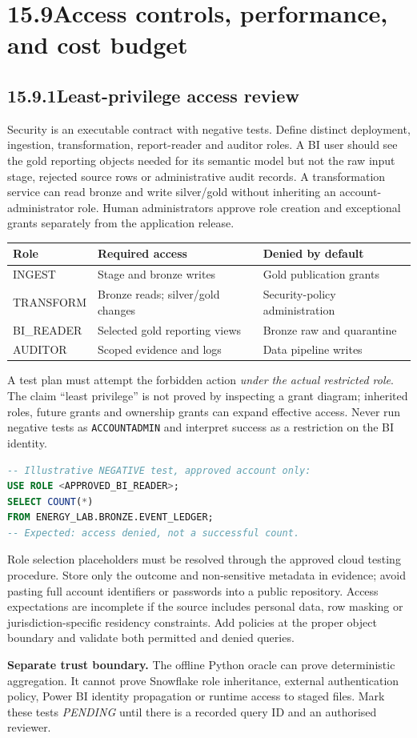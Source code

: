 \documentclass[11pt,twoside]{article}
\newcommand{\topic}[2]{\subsection*{#1\quad #2}}
\begin{document}
\section*{15.9\quad Access controls, performance, and cost budget}
\topic{15.9.1}{Least-privilege access review}
Security is an executable contract with negative tests. Define distinct deployment, ingestion, transformation, report-reader and auditor roles. A BI user should see the gold reporting objects needed for its semantic model but not the raw input stage, rejected source rows or administrative audit records. A transformation service can read bronze and write silver/gold without inheriting an account-administrator role. Human administrators approve role creation and exceptional grants separately from the application release.
\begin{center}\small\begin{tabularx}{\linewidth}{@{}p{27mm}X X@{}}\toprule
Role & Required access & Denied by default\\\midrule
INGEST & Stage and bronze writes & Gold publication grants\\
TRANSFORM & Bronze reads; silver/gold changes & Security-policy administration\\
BI\_READER & Selected gold reporting views & Bronze raw and quarantine\\
AUDITOR & Scoped evidence and logs & Data pipeline writes\\\bottomrule\end{tabularx}\end{center}
A test plan must attempt the forbidden action \emph{under the actual restricted role}. The claim ``least privilege'' is not proved by inspecting a grant diagram; inherited roles, future grants and ownership grants can expand effective access. Never run negative tests as \texttt{ACCOUNTADMIN} and interpret success as a restriction on the BI identity.
\begin{lstlisting}[language=SQL]
-- Illustrative NEGATIVE test, approved account only:
USE ROLE <APPROVED_BI_READER>;
SELECT COUNT(*)
FROM ENERGY_LAB.BRONZE.EVENT_LEDGER;
-- Expected: access denied, not a successful count.
\end{lstlisting}
Role selection placeholders must be resolved through the approved cloud testing procedure. Store only the outcome and non-sensitive metadata in evidence; avoid pasting full account identifiers or passwords into a public repository. Access expectations are incomplete if the source includes personal data, row masking or jurisdiction-specific residency constraints. Add policies at the proper object boundary and validate both permitted and denied queries.
\begin{insight}\textbf{Separate trust boundary.} The offline Python oracle can prove deterministic aggregation. It cannot prove Snowflake role inheritance, external authentication policy, Power BI identity propagation or runtime access to staged files. Mark these tests \emph{PENDING} until there is a recorded query ID and an authorised reviewer.\end{insight}
\end{document}
